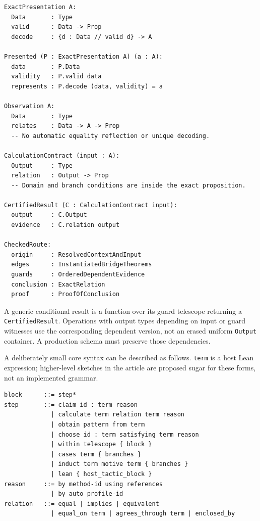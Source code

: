 \documentclass[11pt,letterpaper]{article}
\newcommand{\code}[1]{\nolinkurl{#1}}
\numberwithin{equation}{section}
\begin{document}
\par\noindent\begin{minipage}{\linewidth}
\begin{lstlisting}
ExactPresentation A:
  Data       : Type
  valid      : Data -> Prop
  decode     : {d : Data // valid d} -> A

Presented (P : ExactPresentation A) (a : A):
  data       : P.Data
  validity   : P.valid data
  represents : P.decode (data, validity) = a

Observation A:
  Data       : Type
  relates    : Data -> A -> Prop
  -- No automatic equality reflection or unique decoding.

CalculationContract (input : A):
  Output     : Type
  relation   : Output -> Prop
  -- Domain and branch conditions are inside the exact proposition.

CertifiedResult (C : CalculationContract input):
  output     : C.Output
  evidence   : C.relation output

CheckedRoute:
  origin     : ResolvedContextAndInput
  edges      : InstantiatedBridgeTheorems
  guards     : OrderedDependentEvidence
  conclusion : ExactRelation
  proof      : ProofOfConclusion
\end{lstlisting}
\end{minipage}\par


A generic conditional result is a function over its guard telescope returning a
\code{CertifiedResult}. Operations with output types depending on input or guard
witnesses use the corresponding dependent version, not an erased uniform
\code{Output} container. A production schema must preserve those dependencies.

A deliberately small core syntax can be described as follows. \code{term} is a
host Lean expression; higher-level sketches in the article are proposed sugar
for these forms, not an implemented grammar.
\par\noindent\begin{minipage}{\linewidth}
\begin{lstlisting}
block      ::= step*
step       ::= claim id : term reason
             | calculate term relation term reason
             | obtain pattern from term
             | choose id : term satisfying term reason
             | within telescope { block }
             | cases term { branches }
             | induct term motive term { branches }
             | lean { host_tactic_block }
reason     ::= by method-id using references
             | by auto profile-id
relation   ::= equal | implies | equivalent
             | equal_on term | agrees_through term | enclosed_by
\end{lstlisting}
\end{minipage}\par
\end{document}

